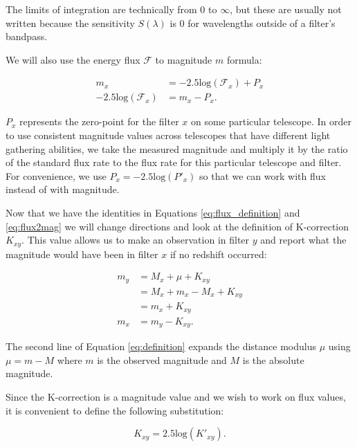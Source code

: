 \documentclass[linenumbers]{aastex631}
\begin{document}
The limits of integration are technically from 0 to $\infty$, but these are
usually not written because the sensitivity $S(\lambda)$ is 0 for wavelengths
outside of a filter's bandpass.

We will also use the energy flux $\mathcal{F}$ to magnitude $m$ formula:

\begin{equation}
\begin{aligned}
\label{eq:flux2mag}
                             m_x &= -2.5 \text{log}(\mathcal{F}_x) + P_x \\
  -2.5 \text{log}(\mathcal{F}_x) &= m_x - P_x .
\end{aligned}
\end{equation}

$P_x$ represents the zero-point for the filter $x$ on some particular
telescope. In order to use consistent magnitude values across telescopes that
have different light gathering abilities, we take the measured magnitude and
multiply it by the ratio of the standard flux rate to the flux rate for this
particular telescope and filter. For convenience, we use $P_x = -2.5
\text{log}(P'_x)$ so that we can work with flux instead of with magnitude.

Now that we have the identities in Equations \ref{eq:flux_definition} and
\ref{eq:flux2mag} we will change directions and look at the definition of
K-correction $K_{xy}$. This value allows us to make an observation in filter
$y$ and report what the magnitude would have been in filter $x$ if no redshift
occurred:

\begin{equation}
\begin{aligned}
\label{eq:definition}
  m_y &= M_x + \mu + K_{xy} \\
      &= M_x + m_x - M_x + K_{xy} \\
      &= m_x + K_{xy} \\
  m_x &= m_y - K_{xy} .
\end{aligned}
\end{equation}

\noindent The second line of Equation \ref{eq:definition} expands the distance modulus
$\mu$ using $\mu = m - M$ where $m$ is the observed magnitude and $M$ is the
absolute magnitude.

Since the K-correction is a magnitude value and we wish to work on flux values,
it is convenient to define the following substitution:

\begin{equation}
\label{eq:k_substitution}
  K_{xy} = 2.5\text{log}(K'_{xy}) .
\end{equation}
\end{document}
